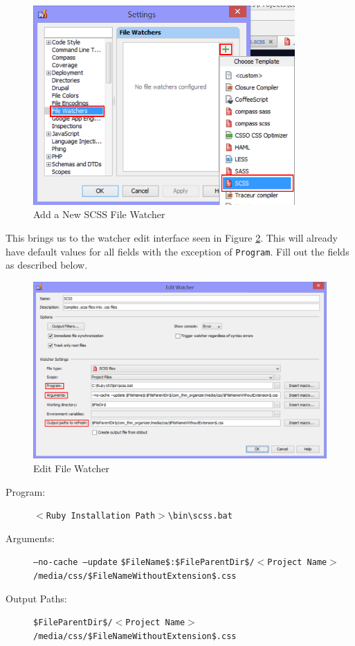\documentclass[]{report}
\begin{document}
\begin{figure}[h] 
	\centering
	\includegraphics[width=10cm]{settingsfilewatchers.png}
	\caption{Add a New SCSS File Watcher}
	\label{fig:addscssfilewatcher}
\end{figure}

\newpage

\noindent
This brings us to the watcher edit interface seen in Figure \ref{fig:watcheredit}. This will already have default values for all fields with the exception of \texttt{Program}. Fill out the fields as described below.\\


\begin{figure}[h] 
  \centering
     \includegraphics[width=16cm]{editwatcher.png}
  \caption{Edit File Watcher}
  \label{fig:watcheredit}
\end{figure}

\begin{description}
	\item[Program:] \texttt{$<$Ruby Installation Path$>$\textbackslash bin\textbackslash scss.bat}
	\item[Arguments:] \texttt{--no-cache --update} \newline \texttt{\$FileName\$:\$FileParentDir\$/$<$Project Name$>$/media/css/\$FileNameWithoutExtension\$.css}
	\item[Output Paths:] \texttt{\$FileParentDir\$/$<$Project Name$>$/media/css/\$FileNameWithoutExtension\$.css}
\end{description}
\end{document}
